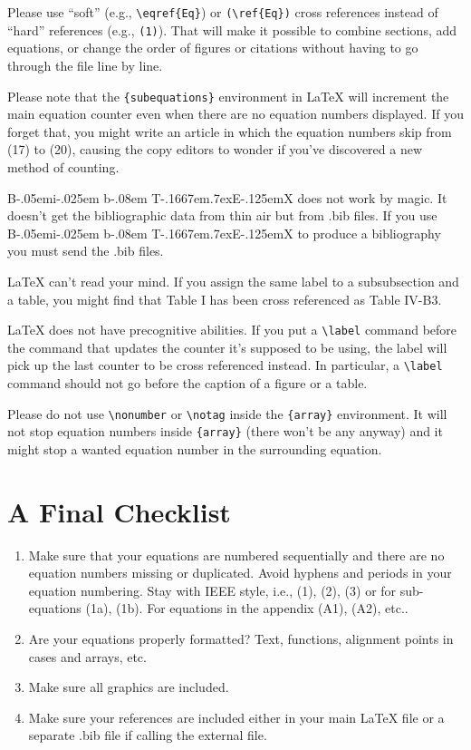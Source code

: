 \documentclass[10pt,journal,compsoc]{IEEEtran}
\def\BibTeX{{\rm B\kern-.05em{\sc i\kern-.025em b}\kern-.08em
    T\kern-.1667em\lower.7ex\hbox{E}\kern-.125emX}}
\begin{document}
Please use ``soft'' (e.g., \verb|\eqref{Eq}|) or \verb|(\ref{Eq})|
cross references instead of ``hard'' references (e.g., \verb|(1)|).
That will make it possible to combine sections, add equations, or
change the order of figures or citations without having to go through
the file line by line.

Please note that the \verb|{subequations}| environment in {\LaTeX}
will increment the main equation counter even when there are no
equation numbers displayed. If you forget that, you might write an
article in which the equation numbers skip from (17) to (20), causing
the copy editors to wonder if you've discovered a new method of
counting.

    {\BibTeX} does not work by magic. It doesn't get the bibliographic
data from thin air but from .bib files. If you use {\BibTeX} to produce a
bibliography you must send the .bib files.

    {\LaTeX} can't read your mind. If you assign the same label to a
subsubsection and a table, you might find that Table I has been cross
referenced as Table IV-B3.

{\LaTeX} does not have precognitive abilities. If you put a
\verb|\label| command before the command that updates the counter it's
supposed to be using, the label will pick up the last counter to be
cross referenced instead. In particular, a \verb|\label| command
should not go before the caption of a figure or a table.

Please do not use \verb|\nonumber| or \verb|\notag| inside the
\verb|{array}| environment. It will not stop equation numbers inside
\verb|{array}| (there won't be any anyway) and it might stop a wanted
equation number in the surrounding equation.

\balance

\section{A Final Checklist}
\begin{enumerate}{}{}
    \item{Make sure that your equations are numbered sequentially and there are no equation numbers missing or duplicated. Avoid hyphens and periods in your equation numbering. Stay with IEEE style, i.e., (1), (2), (3) or for sub-equations (1a), (1b). For equations in the appendix (A1), (A2), etc.}.
    \item{Are your equations properly formatted? Text, functions, alignment points in cases and arrays, etc. }
    \item{Make sure all graphics are included.}
    \item{Make sure your references are included either in your main LaTeX file or a separate .bib file if calling the external file.}
\end{enumerate}
\end{document}
